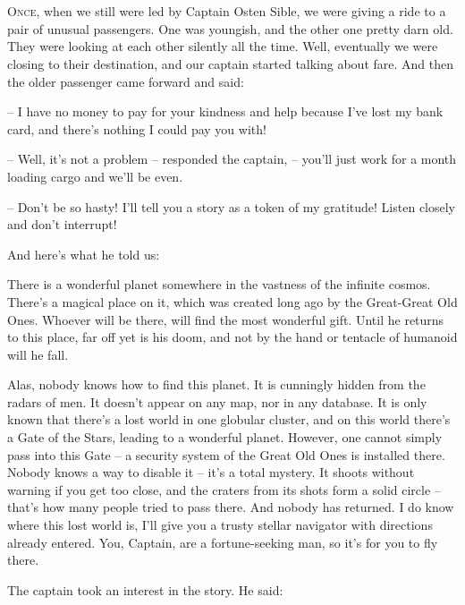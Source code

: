 \documentclass[ebook,oneside,final,openright]{memoir}
\begin{document}
\chapter{}
\par
\lettrine{O}{nce,} when we still were led by Captain Osten Sible, we were giving a ride to a pair of unusual passengers. One was youngish, and the other one pretty darn old. They were looking at each other silently all the time. Well, eventually we were closing to their destination, and our captain started talking about fare. And then the older passenger came forward and said: \par
\par
– I have no money to pay for your kindness and help because I’ve lost my bank card, and there’s nothing I could pay you with!\par
– Well, it’s not a problem – responded the captain, – you’ll just work for a month loading cargo and we’ll be even. \par
– Don’t be so hasty! I’ll tell you a story as a token of my gratitude! Listen closely and don’t interrupt! \par
 And here’s what he told us:\par
\par
 There is a wonderful planet somewhere in the vastness of the infinite cosmos. There’s a magical place on it, which was created long ago by the Great-Great Old Ones. Whoever will be there, will find the most wonderful gift. Until he returns to this place, far off yet is his doom, and not by the hand or tentacle of humanoid will he fall. \par
Alas, nobody knows how to find this planet. It is cunningly hidden from the radars of men. It doesn’t appear on any map, nor in any database. It is only known that there’s a lost world in one globular cluster, and on this world there’s a Gate of the Stars, leading to a wonderful planet. However, one cannot simply pass into this Gate – a security system of the Great Old Ones is installed there. Nobody knows a way to disable it – it’s a total mystery. It shoots without warning if you get too close, and the craters from its shots form a solid circle – that’s how many people tried to pass there. And nobody has returned. I do know where this lost world is, I’ll give you a trusty stellar navigator with directions already entered. You, Captain, are a fortune-seeking man, so it’s for you to fly there.\par
\par
The captain took an interest in the story. He said:\par
\end{document}
